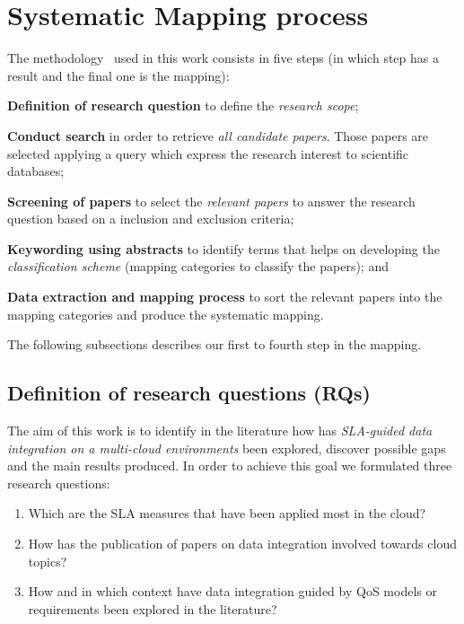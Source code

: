 \section{Systematic Mapping process}\label{sec:sm}

The methodology~\cite{SM:Petersen:2008} used in this work consists in five steps
(in which step has a result and the final one is the mapping):

\begin{description}
\item \textbf{Definition of research question} to define the \textit{research scope};
\item \textbf{Conduct search} in order to retrieve \textit{all candidate papers}. Those papers are selected applying a query which express the research interest to scientific databases;
\item  \textbf{Screening of papers} to select the \textit{relevant papers} to answer the research question based on a inclusion and exclusion criteria;
\item \textbf{Keywording using abstracts} to identify terms that helps on developing the \textit{classification scheme} (mapping categories to classify the papers); and
\item \textbf{Data extraction and mapping process} to sort the relevant papers into the mapping categories and produce the systematic mapping.
\end{description}

The following subsections describes our first to fourth step in the
mapping. %
 
\subsection{Definition of research questions (RQs)}
The aim of this work is to identify in the literature how has \textit{SLA-guided
data integration on a multi-cloud environments} been explored, discover possible
gaps and the main results produced.    
In order to achieve this goal we formulated three research questions:
\begin{enumerate}
\item Which are the SLA measures that have been applied most in the cloud?
\item How has the publication of papers on data integration involved towards cloud topics?
\item How and in which context have data integration guided by QoS models or requirements been explored in the literature?
\end{enumerate}

